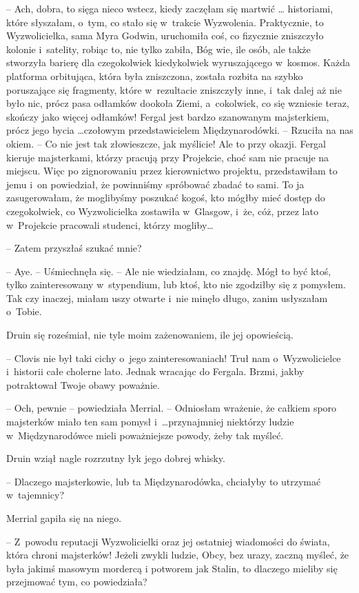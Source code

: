\documentclass[oneside,polish,11pt,sfheadings]{mwbk}
\begin{document}
-- Ach, dobra, to sięga nieco wstecz, kiedy zaczęłam się martwić \ldots
historiami, które słyszałam, o~tym, co stało się w~trakcie Wyzwolenia.
Praktycznie, to Wyzwolicielka, sama Myra Godwin, uruchomiła coś, co
fizycznie zniszczyło kolonie i~satelity, robiąc to, nie tylko zabiła,
Bóg wie, ile osób, ale także stworzyła barierę dla czegokolwiek
kiedykolwiek wyruszającego w~kosmos. Każda platforma orbitująca, która
była zniszczona, została rozbita na szybko poruszające się fragmenty,
które w~rezultacie zniszczyły inne, i~tak dalej aż nie było nic, prócz
pasa odłamków dookoła Ziemi, a~cokolwiek, co się wzniesie teraz, skończy
jako więcej odłamków! Fergal jest bardzo szanowanym majsterkiem, prócz
jego bycia \ldots czołowym przedstawicielem Międzynarodówki. -- Rzuciła na
nas okiem. -- Co nie jest tak złowieszcze, jak myślicie! Ale to przy
okazji. Fergal kieruje majsterkami, którzy pracują przy Projekcie, choć
sam nie pracuje na miejscu. Więc po zignorowaniu przez kierownictwo
projektu, przedstawiłam to jemu i~on powiedział, że powinniśmy spróbować
zbadać to sami. To ja zasugerowałam, że moglibyśmy poszukać kogoś, kto
mógłby mieć dostęp do czegokolwiek, co Wyzwolicielka zostawiła w~Glasgow, i~że, cóż, przez lato w~Projekcie pracowali studenci, którzy
mogliby\ldots

-- Zatem przyszłaś szukać mnie?

-- Aye. -- Uśmiechnęła się. -- Ale nie wiedziałam, co znajdę. Mógł to być
ktoś, tylko zainteresowany w~stypendium, lub ktoś, kto nie zgodziłby się
z pomysłem. Tak czy inaczej, miałam uszy otwarte i~nie minęło długo,
zanim usłyszałam o~Tobie.

Druin się roześmiał, nie tyle moim zażenowaniem, ile jej opowieścią.

-- Clovis nie był taki cichy o~jego zainteresowaniach! Truł nam o~Wyzwolicielce i~historii całe cholerne lato. Jednak wracając do Fergala.
Brzmi, jakby potraktował Twoje obawy poważnie.

-- Och, pewnie -- powiedziała Merrial. -- Odniosłam wrażenie, że całkiem
sporo majsterków miało ten sam pomysł i~\ldots przynajmniej niektórzy
ludzie w~Międzynarodówce mieli poważniejsze powody, żeby tak myśleć.

Druin wziął nagle rozrzutny łyk jego dobrej whisky.

-- Dlaczego majsterkowie, lub ta Międzynarodówka, chciałyby to utrzymać w~tajemnicy?

Merrial gapiła się na niego. 

-- Z~powodu reputacji Wyzwolicielki oraz jej
ostatniej wiadomości do świata, która chroni majsterków! Jeżeli zwykli
ludzie, Obcy, bez urazy, zaczną myśleć, że była jakimś masowym mordercą
i potworem jak Stalin, to dlaczego mieliby się przejmować tym, co
powiedziała?
\end{document}
